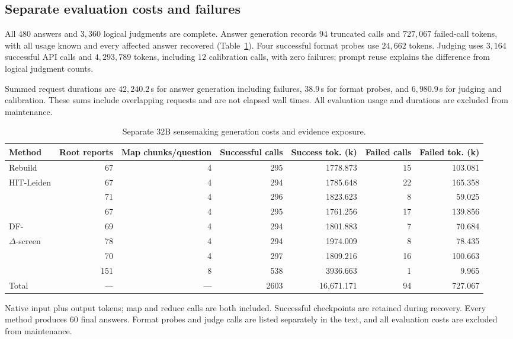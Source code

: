 \subsection{Separate evaluation costs and failures}\label{app:case-eval-costs}

All $480$ answers and $3{,}360$ logical judgments are complete.
Answer generation records $94$ truncated calls and $727{,}067$ failed-call
tokens, with all usage known and every affected answer recovered
(Table~\ref{tab:sensemaking-costs}). Four successful format probes use
$24{,}662$ tokens. Judging uses $3{,}164$ successful API calls and
$4{,}293{,}789$ tokens, including $12$ calibration calls, with zero failures;
prompt reuse explains the difference from logical judgment counts.

Summed request durations are $42{,}240.2$\,s for answer generation including
failures, $38.9$\,s for format probes, and $6{,}980.9$\,s for judging and
calibration. These sums include overlapping requests and are not elapsed
wall times. All evaluation usage and durations are excluded from maintenance.

\begin{table}[tb]\centering
\caption{Separate 32B sensemaking generation costs and evidence exposure.}
\label{tab:sensemaking-costs}
\footnotesize
\setlength{\tabcolsep}{0.25em}
\begin{tabular*}{\linewidth}{@{\extracolsep{\fill}}lrrrrrr@{}}
\toprule
Method & Root reports & Map chunks/question & Successful calls & Success tok. (k) & Failed calls & Failed tok. (k) \\
\midrule
Rebuild & 67 & 4 & 295 & 1778.873 & 15 & 103.081 \\
HIT-Leiden & 67 & 4 & 294 & 1785.648 & 22 & 165.358 \\
\DynaMo{} & 71 & 4 & 296 & 1823.623 & 8 & 59.025 \\
\QCA{} & 67 & 4 & 295 & 1761.256 & 17 & 139.856 \\
DF-\Louvain{} & 69 & 4 & 294 & 1801.883 & 7 & 70.684 \\
$\Delta$-screen & 78 & 4 & 294 & 1974.009 & 8 & 78.435 \\
\Batch{} & 70 & 4 & 297 & 1809.216 & 16 & 100.663 \\
\DyLo{} & 151 & 8 & 538 & 3936.663 & 1 & 9.965 \\
\midrule
Total & --- & --- & 2603 & 16,671.171 & 94 & 727.067 \\
\bottomrule
\end{tabular*}
\par\smallskip\raggedright
Native input plus output tokens; map and reduce calls are both included.
Successful checkpoints are retained during recovery. Every method produces
$60$ final answers. Format probes and judge calls are listed separately in
the text, and all evaluation costs are excluded from maintenance.
\end{table}
